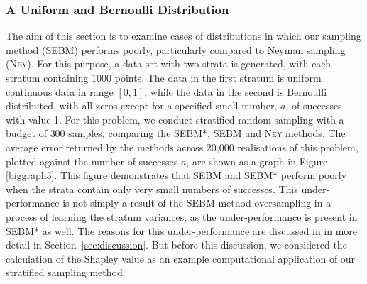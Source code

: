 \subsubsection{A Uniform and Bernoulli Distribution}
\label{sec:dataset2}
The aim of this section is to examine cases of distributions in which our sampling method (SEBM) performs poorly, particularly compared to Neyman sampling (\textsc{Ney}).
For this purpose, a data set with two strata is generated, with each stratum containing $1000$ points. 
The data in the first stratum is uniform continuous data in range $[0,1]$, while the data in the second is Bernoulli distributed, with all zeros except for a specified small number, $a$, of successes with value 1.
For this problem, we conduct stratified random sampling with a budget of $300$ samples, comparing the SEBM*, SEBM and \textsc{Ney} methods.
The average error returned by the methods across 20,000 realisations of this problem, plotted against the number of successes $a$, are shown as a graph in Figure \ref{biggraph3}.
This figure demonstrates that SEBM and SEBM* perform poorly when the strata contain only very small numbers of successes.
This under-performance is not simply a result of the SEBM method oversampling in a process of learning the stratum variances, as the under-performance is present in SEBM* as well.
The reasons for this under-performance are discussed in in more detail in Section~\ref{sec:discussion}.
But before this discussion, we considered the calculation of the Shapley value as an example computational application of our stratified sampling method.











